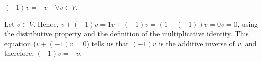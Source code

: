 \begin{thm} 
  \label{thm: minus one times a vector}
  $(-1)v = -v \quad \forall v\in V$.
\end{thm}
\begin{prf}
  Let $v \in V$. Hence, $v + (-1)v = 1v + (-1)v = (1 + (-1))v = 0v = 0$, using the distributive property and the definition of the multiplicative identity. This equation ($v+(-1)v=0$) tells us that $(-1)v$ is the additive inverse of $v$, and therefore, $(-1)v = -v$.
\end{prf}

